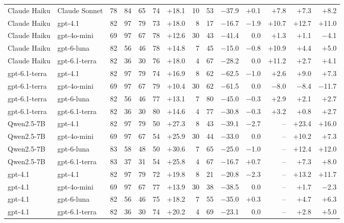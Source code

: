 \begin{table}[t]
\begin{tabular}{llrrrrrrrrrrrr}
Claude Haiku & Claude Sonnet & 78 & 84 & 65 & 74 & $+$18.1 & 10 & 53 & $-$37.9 & $+$0.1 & $+$7.8 & $+$7.3 & $+$8.2 \\
Claude Haiku & gpt-4.1 & 82 & 97 & 79 & 73 & $+$18.0 & 8 & 17 & $-$16.7 & $-$1.9 & $+$10.7 & $+$12.7 & $+$11.0 \\
Claude Haiku & gpt-4o-mini & 69 & 97 & 67 & 78 & $+$12.6 & 30 & 43 & $-$41.4 & 0.0 & $+$1.3 & $+$1.1 & $-$4.1 \\
Claude Haiku & gpt-6-luna & 82 & 56 & 46 & 78 & $+$14.8 & 7 & 45 & $-$15.0 & $-$0.8 & $+$10.9 & $+$4.4 & $+$5.0 \\
Claude Haiku & gpt-6.1-terra & 82 & 36 & 30 & 76 & $+$18.0 & 4 & 67 & $-$28.2 & 0.0 & $+$11.2 & $+$2.7 & $+$4.1 \\
gpt-6.1-terra & gpt-4.1 & 82 & 97 & 79 & 74 & $+$16.9 & 8 & 62 & $-$62.5 & $-$1.0 & $+$2.6 & $+$9.0 & $+$7.3 \\
gpt-6.1-terra & gpt-4o-mini & 69 & 97 & 67 & 79 & $+$10.4 & 30 & 62 & $-$61.5 & 0.0 & $-$8.0 & $-$8.4 & $-$11.7 \\
gpt-6.1-terra & gpt-6-luna & 82 & 56 & 46 & 77 & $+$13.1 & 7 & 80 & $-$45.0 & $-$0.3 & $+$2.9 & $+$2.1 & $+$2.7 \\
gpt-6.1-terra & gpt-6.1-terra & 82 & 36 & 30 & 80 & $+$14.6 & 4 & 77 & $-$30.8 & $-$0.3 & $+$3.2 & $+$0.8 & $+$2.7 \\
Qwen2.5-7B & gpt-4.1 & 82 & 97 & 79 & 50 & $+$27.3 & 8 & 43 & $-$39.1 & $-$2.7 & -- & $+$23.4 & $+$16.0 \\
Qwen2.5-7B & gpt-4o-mini & 69 & 97 & 67 & 54 & $+$25.9 & 30 & 44 & $-$33.0 & 0.0 & -- & $+$10.2 & $+$7.3 \\
Qwen2.5-7B & gpt-6-luna & 83 & 58 & 48 & 50 & $+$30.6 & 7 & 65 & $-$25.0 & $-$1.0 & -- & $+$12.4 & $+$12.0 \\
Qwen2.5-7B & gpt-6.1-terra & 83 & 37 & 31 & 54 & $+$25.8 & 4 & 67 & $-$16.7 & $+$0.7 & -- & $+$7.3 & $+$8.0 \\
gpt-4.1 & gpt-4.1 & 82 & 97 & 79 & 72 & $+$19.8 & 8 & 21 & $-$20.8 & $-$2.3 & -- & $+$13.2 & $+$11.7 \\
gpt-4.1 & gpt-4o-mini & 69 & 97 & 67 & 77 & $+$13.9 & 30 & 38 & $-$38.5 & 0.0 & -- & $+$1.7 & $-$2.3 \\
gpt-4.1 & gpt-6-luna & 82 & 56 & 46 & 75 & $+$18.2 & 7 & 55 & $-$35.0 & $+$0.3 & -- & $+$4.7 & $+$6.3 \\
gpt-4.1 & gpt-6.1-terra & 82 & 36 & 30 & 74 & $+$20.2 & 4 & 69 & $-$23.1 & 0.0 & -- & $+$2.8 & $+$5.0 \\
\bottomrule
\end{tabular}

\end{table}
